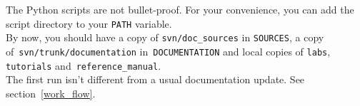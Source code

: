 \documentclass[a4paper,10pt]{article}
\newcommand{\code}[1]{\texttt{#1}}
\begin{document}
The Python scripts are not bullet-proof. For your convenience, you can add the script directory to your \verb+PATH+ variable.\\

By now, you should have a copy of \code{svn/doc\_sources} in \code{SOURCES}, a copy of~\code{svn/trunk/documentation} in~\code{DOCUMENTATION} and local copies of \code{labs}, \code{tutorials} and~\code{reference\_manual}.\\

The first run isn't different from a usual documentation update. See section~\ref{work_flow}.




% 
% 



\end{document}
